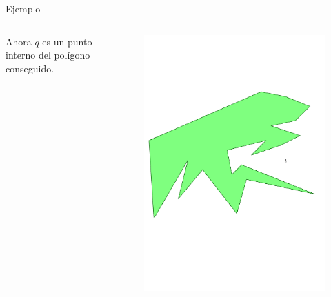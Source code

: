 \documentclass[aspectratio=169,xcolor=dvipsnames, t]{beamer}
\begin{document}
\begin{frame}{Ejemplo}
  \begin{columns}
    \begin{column}{0.5\textwidth}
      Ahora $q$ es un punto interno del polígono conseguido.
    \end{column}
    \begin{column}{0.5\textwidth}
      \begin{figure}
        \centering
        \includegraphics[width=\linewidth, height=1.5\textheight, page=6, keepaspectratio]{IPE/point_visibility.pdf}
      \end{figure}
    \end{column}
  \end{columns}
\end{frame}
\end{document}
